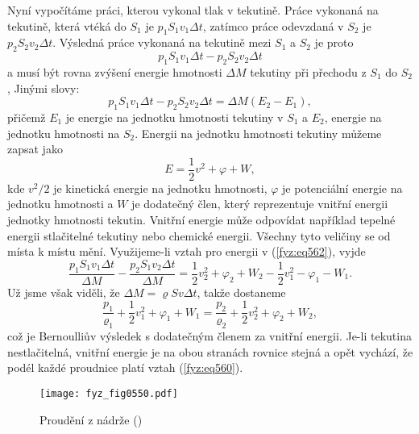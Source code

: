     Nyní vypočítáme práci, kterou vykonal tlak v tekutině. Práce vykonaná na tekutině, která vtéká 
    do \(S_1\) je \(p_1S_1v_1\Delta t\), zatímco práce odevzdaná v \(S_2\) je \(p_2S_2v_2\Delta 
    t\). Výsledná práce vykonaná na tekutině mezi \(S_1\) a \(S_2\) je proto
    \begin{equation*}
      p_1S_1v_1\Delta t - p_2S_2v_2\Delta t
    \end{equation*}
    a musí být rovna zvýšení energie hmotnosti \(\Delta M\) tekutiny při přechodu z \(S_1\) do 
    \(S_2\), Jinými slovy:
    \begin{equation}\label{fyz:eq562}
      p_1S_1v_1\Delta t - p_2S_2v_2\Delta t = \Delta M(E_2 - E_1),
    \end{equation}
    přičemž \(E_1\) je energie na jednotku hmotnosti tekutiny v \(S_1\) a \(E_2\), energie na 
    jednotku hmotnosti na \(S_2\). Energii na jednotku hmotnosti tekutiny můžeme zapsat jako
    \begin{equation*}
      E = \dfrac{1}{2}v^2 + \varphi + W,
    \end{equation*}
    kde \(v^2/2\) je kinetická energie na jednotku hmotnosti, \(\varphi\) je potenciální energie na 
    jednotku hmotnosti a \(W\) je dodatečný člen, který reprezentuje vnitřní energii jednotky 
    hmotnosti tekutin. Vnitřní energie může odpovídat například tepelné energii stlačitelné 
    tekutiny nebo chemické energii. Všechny tyto veličiny se od místa k místu mění. Využijeme-li 
    vztah pro energii v (\ref{fyz:eq562}), vyjde
    \begin{equation*}
      \dfrac{p_1S_1v_1\Delta t}{\Delta M} - \dfrac{p_2S_1v_2\Delta t}{\Delta M} = 
        \dfrac{1}{2}v_2^2 + \varphi_2 + W_2 - \dfrac{1}{2}v_1^2 - \varphi_1 - W_1.
    \end{equation*}
    Už jsme však viděli, že \(\Delta M= \varrho Sv\Delta t\), takže dostaneme
    \begin{equation}\label{fyz:eq563}
      \dfrac{p_1}{\varrho_1} + \dfrac{1}{2}v_1^2 + \varphi_1 + W_1 
        = \dfrac{p_2}{\varrho_2} + \dfrac{1}{2}v_2^2 + \varphi_2 + W_2,
    \end{equation}
    což je Bernoulliův výsledek s dodatečným členem za vnitřní energii. Je-li tekutina 
    nestlačitelná, vnitřní energie je na obou stranách rovnice stejná a opět vychází, že podél 
    každé proudnice platí vztah (\ref{fyz:eq560}).
    
    \begin{figure}[ht!] %
      \centering
      \texttt{[image: fyz\_fig0550.pdf]}
      \caption{Proudění z nádrže
               (\cite[s.~749]{Feynman02})}
      \label{fyz:fig0550}
    \end{figure}

